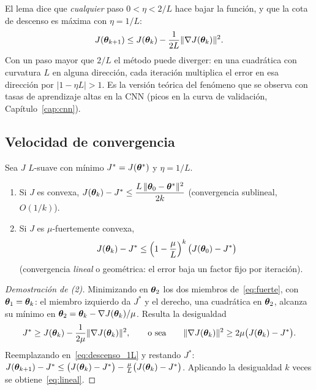 El lema dice que \emph{cualquier} paso $0 < \eta < 2/L$ hace bajar la función, y que la cota de descenso
es máxima con $\eta = 1/L$:
\begin{equation}
  J(\boldsymbol{\theta}_{k+1}) \le J(\boldsymbol{\theta}_k) - \frac{1}{2L}\lVert\nabla J(\boldsymbol{\theta}_k)\rVert^2.
  \label{eq:descenso_1L}
\end{equation}
Con un paso mayor que $2/L$ el método puede diverger: en una cuadrática con curvatura $L$ en alguna dirección,
cada iteración multiplica el error en esa dirección por $|1 - \eta L| > 1$. Es la versión teórica del
fenómeno que se observa con tasas de aprendizaje altas en la CNN (picos en la curva de validación,
Capítulo~\ref{cap:cnn}).

\subsection{Velocidad de convergencia}

\begin{teorema}
\label{teo:convergencia}
Sea $J$ $L$-suave con mínimo $J^* = J(\boldsymbol{\theta}^*)$ y $\eta = 1/L$.
\begin{enumerate}
  \item Si $J$ es convexa, $J(\boldsymbol{\theta}_k) - J^* \le \dfrac{L\,\lVert\boldsymbol{\theta}_0 - \boldsymbol{\theta}^*\rVert^2}{2k}$ (convergencia sublineal, $O(1/k)$).
  \item Si $J$ es $\mu$-fuertemente convexa,
        \begin{equation}
          J(\boldsymbol{\theta}_k) - J^* \le \Big(1 - \frac{\mu}{L}\Big)^k\,\big(J(\boldsymbol{\theta}_0) - J^*\big)
          \label{eq:lineal}
        \end{equation}
        (convergencia \emph{lineal} o geométrica: el error baja un factor fijo por iteración).
\end{enumerate}
\end{teorema}
\begin{proof}[Demostración de (2)]
Minimizando en $\boldsymbol{\theta}_2$ los dos miembros de~\eqref{eq:fuerte}, con $\boldsymbol{\theta}_1 = \boldsymbol{\theta}_k$: el miembro izquierdo da
$J^*$ y el derecho, una cuadrática en $\boldsymbol{\theta}_2$, alcanza su mínimo en $\boldsymbol{\theta}_2 = \boldsymbol{\theta}_k - \nabla J(\boldsymbol{\theta}_k)/\mu$.
Resulta la desigualdad
\[
  J^* \ge J(\boldsymbol{\theta}_k) - \frac{1}{2\mu}\lVert\nabla J(\boldsymbol{\theta}_k)\rVert^2,
  \qquad\text{o sea}\qquad
  \lVert\nabla J(\boldsymbol{\theta}_k)\rVert^2 \ge 2\mu\big(J(\boldsymbol{\theta}_k) - J^*\big).
\]
Reemplazando en~\eqref{eq:descenso_1L} y restando $J^*$:
$J(\boldsymbol{\theta}_{k+1}) - J^* \le \big(J(\boldsymbol{\theta}_k) - J^*\big) - \frac{\mu}{L}\big(J(\boldsymbol{\theta}_k) - J^*\big)$. Aplicando la
desigualdad $k$ veces se obtiene~\eqref{eq:lineal}.
\end{proof}

